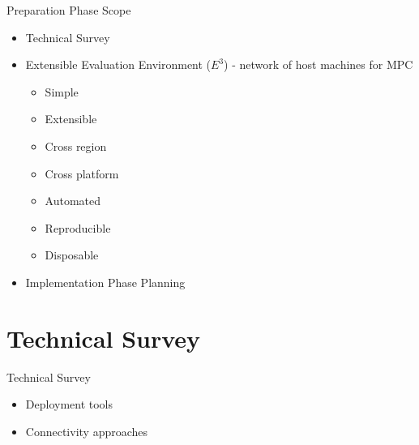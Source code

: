 \begin{frame}{Preparation Phase Scope}
\protect\hypertarget{preparation-phase-scope}{}
\begin{itemize}
\tightlist
\item
  Technical Survey
\item
  Extensible Evaluation Environment (\(E^3\)) - network of host machines
  for MPC

  \begin{itemize}
  \tightlist
  \item
    Simple
  \item
    Extensible
  \item
    Cross region
  \item
    Cross platform
  \item
    Automated
  \item
    Reproducible
  \item
    Disposable
  \end{itemize}
\item
  Implementation Phase Planning
\end{itemize}
\end{frame}

\begin{frame}{}
\protect\hypertarget{section}{}
\section{Technical Survey}
\end{frame}

\begin{frame}{Technical Survey}
\protect\hypertarget{technical-survey}{}
\begin{itemize}
\tightlist
\item
  Deployment tools
\item
  Connectivity approaches
\end{itemize}
\end{frame}

